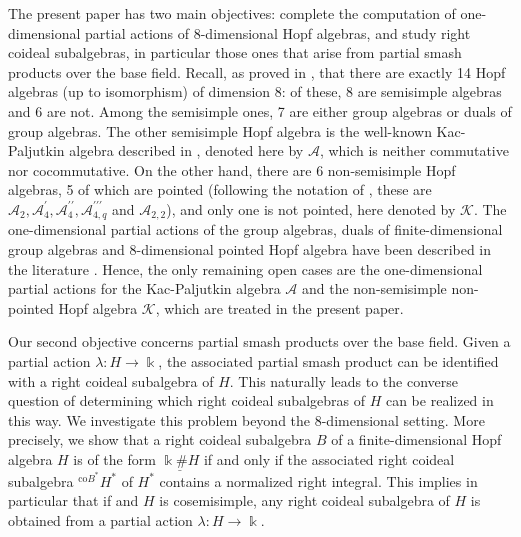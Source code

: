 \documentclass[reqno]{amsart}
\theoremstyle{definition}
\numberwithin{equation}{section}\theoremstyle{plain}
\theoremstyle{definition}
\begin{document}
The present paper has two main objectives: complete the computation of one-dimensional partial actions of 8-dimensional Hopf algebras, and study right coideal subalgebras, in particular those ones that arise from partial smash products over the base field. Recall, as proved in \cite{stefan}, that there are exactly 14 Hopf algebras (up to isomorphism) of dimension 8: of these, 8 are semisimple algebras and 6 are not.
Among the semisimple ones, 7 are either group algebras or duals of group algebras. 
The other semisimple Hopf algebra is the well-known Kac-Paljutkin algebra described in \cite{masuoka}, denoted here by $\mathcal{A}$, which is neither commutative nor cocommutative.
On the other hand, there are 6 non-semisimple Hopf algebras, 5 of which are pointed (following the notation of \cite{classifying}, these are $\mathcal{A}_2, \mathcal{A}^\prime_4,\mathcal{A}^{\prime \prime}_4,\mathcal{A}^{\prime \prime \prime}_{4,q}$ and $\mathcal{A}_{2,2}$), and only one is not pointed, here denoted by $\mathcal{K}$. The one-dimensional partial actions of the group algebras, duals of finite-dimensional group algebras and 8-dimensional pointed Hopf algebra have been described in the literature \cites{Alvares_Alves_Batista, corresponding}. Hence, the only remaining open cases are the one-dimensional partial actions for the Kac-Paljutkin algebra $\mathcal{A}$ and the non-semisimple non-pointed Hopf algebra $\mathcal{K}$, which are treated in the present paper.

\medbreak

Our second objective concerns partial smash products over the base field. Given a partial action $\lambda:H\to\Bbbk$, the associated partial smash product can be identified with a right coideal subalgebra of $H$. This naturally leads to the converse question of determining which right coideal subalgebras of $H$ can be realized in this way. We investigate this problem beyond the 8-dimensional setting. More precisely, we show that a right coideal subalgebra \(B\) of a finite-dimensional Hopf algebra \(H\) is of the form \(\underline{\Bbbk \# H}\) if and only if the associated right coideal subalgebra \(^{\mathrm{co} B^*} H^*\) of \(H^*\) contains a normalized right integral. This implies in particular that if and \(H\) is cosemisimple, any right coideal subalgebra of \(H\) is obtained from a partial action \(\lambda : H \to \Bbbk\).


\medbreak
\end{document}
